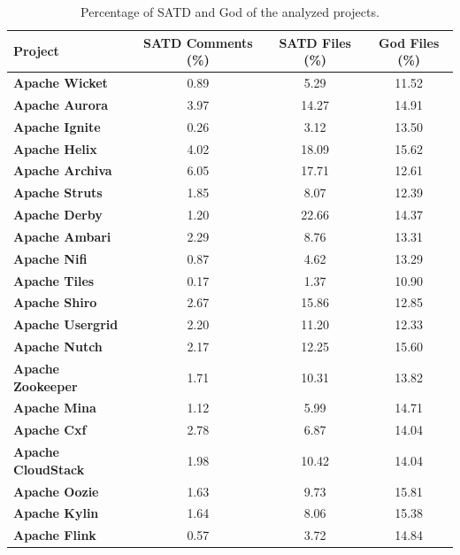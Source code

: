 \begin{landscape}
	
	
	
	\begin{table}[htbp]
		\small
		\centering
		\caption{Percentage of SATD and God of the analyzed projects.}
		\begin{adjustbox}{width=1.0\textwidth}
			
			
			\begin{tabular}{l|c|c|c}
				\hline
				\textbf{Project}  & \textbf{SATD Comments (\%)}  & \textbf{SATD Files (\%)} & \textbf{God Files (\%)} \\ \hline
				\textbf{Apache Wicket} &  0.89 & 5.29 & 11.52    \\ \hline
				\textbf{Apache Aurora} &  3.97 & 14.27 & 14.91    \\ \hline
				\textbf{Apache Ignite} &  0.26 & 3.12 & 13.50   \\ \hline
				\textbf{Apache Helix} &  4.02 & 18.09 & 15.62    \\ \hline
				\textbf{Apache Archiva} &  6.05 & 17.71 & 12.61    \\ \hline
				\textbf{Apache Struts} &  1.85 & 8.07 & 12.39    \\ \hline
				\textbf{Apache Derby} &  1.20 & 22.66 & 14.37    \\ \hline
				\textbf{Apache Ambari} &  2.29 & 8.76 & 13.31   \\ \hline
				\textbf{Apache Nifi} &  0.87 & 4.62 & 13.29    \\ \hline
				\textbf{Apache Tiles} &  0.17 & 1.37 & 10.90    \\ \hline
				\textbf{Apache Shiro} &  2.67 & 15.86 & 12.85    \\ \hline
				\textbf{Apache Usergrid} &  2.20 & 11.20 & 12.33    \\ \hline
				\textbf{Apache Nutch} &  2.17 & 12.25 & 15.60    \\ \hline
				\textbf{Apache Zookeeper} &  1.71 & 10.31 & 13.82   \\ \hline
				\textbf{Apache Mina} &  1.12 & 5.99 & 14.71   \\ \hline
				\textbf{Apache Cxf} &  2.78 & 6.87 & 14.04   \\ \hline
				\textbf{Apache CloudStack} &  1.98 & 10.42 & 14.04   \\ \hline
				\textbf{Apache Oozie} &  1.63 & 9.73 & 15.81   \\ \hline
				\textbf{Apache Kylin} &  1.64 & 8.06 & 15.38   \\ \hline
				\textbf{Apache Flink} &  0.57 & 3.72 & 14.84   \\ \hline
				
			\end{tabular}
			\label{table:projects_satd_god_percentage2}
			
		\end{adjustbox}
		
	\end{table}
	
\end{landscape}


